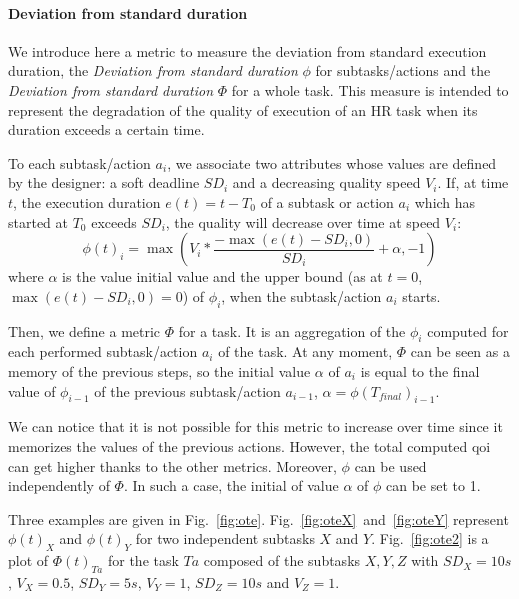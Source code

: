 \documentclass[a4paper,11pt,twoside]{StyleThese}
\begin{document}
\paragraph{Deviation from standard duration}\label{subsubsec:ote}
We introduce here a metric to measure the deviation from standard execution duration, the \textit{Deviation from standard duration} $\phi$ for subtasks/actions and the \textit{Deviation from standard duration} $\Phi$ for a whole task. This measure is intended to represent the degradation of the quality of execution of an HR task when its duration exceeds a certain time. 

To each subtask/action $a_i$, we associate two attributes whose values are defined by the designer: a soft deadline $SD_i$ and a decreasing quality  speed $V_i$. 
If, at time $t$, the execution duration  $e(t) = t - T_0$ of a subtask or action $a_i$ which has started at $T_0$ exceeds $SD_i$, the quality will decrease over time at speed $V_i$: 
\begin{equation}\label{eq:ote}
\phi(t)_i=\max\left( V_i*\frac{-\max(e(t)-SD_i,0)}{SD_i}+\alpha,-1\right)
\end{equation}
where $\alpha$ is the value initial value and the upper bound (as at $t=0$, $\max(e(t)-SD_i,0)=0$) of $\phi_i$, when the subtask/action $a_i$ starts.

Then, we define a metric $\Phi$ for a task. It is an aggregation of the $\phi_i$ computed for each performed subtask/action $a_i$ of the task. At any moment, $\Phi$ can be seen as a memory of the previous steps, so the initial value $\alpha$ of $a_i$ is equal to the final value of $\phi_{i-1}$ of the previous subtask/action $a_{i-1}$, $\alpha=\phi(T_{final})_{i-1}$.


We can notice that it is not possible for this metric to increase over time since it memorizes the values of the previous actions. However, the total computed \acrshort{qoi} can get higher thanks to the other metrics. Moreover, $\phi$ can be used independently of $\Phi$. In such a case, the initial of value $\alpha$ of $\phi$ can be set to 1. 

Three examples are given in Fig.~\ref{fig:ote}. Fig.~\ref{fig:oteX}~and~\ref{fig:oteY} represent $\phi(t)_{X}$ and $\phi(t)_{Y}$ for two independent subtasks $X$ and $Y$. Fig.~\ref{fig:ote2} is a plot of $\Phi(t)_{Ta}$ for the task $Ta$ composed of the subtasks $X, Y, Z$ with $SD_X=10 s$, $V_X=0.5$, $SD_Y=5 s$, $V_Y=1$, $SD_Z=10 s$ and $V_Z=1$.
\end{document}
